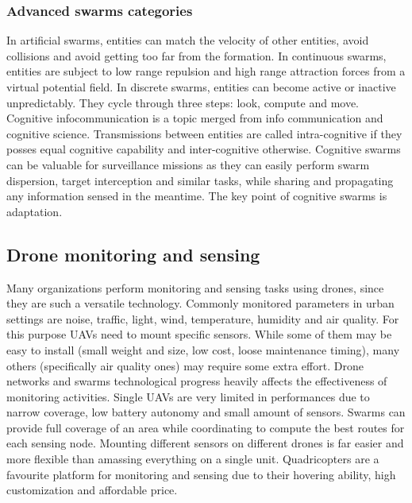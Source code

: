 \documentclass[journal]{IEEEtran}
\begin{document}
\subsubsection{Advanced swarms categories}
In artificial swarms, entities can match the velocity of other entities, avoid collisions and avoid getting too far from the formation. In continuous swarms, entities are subject to low range repulsion and high range attraction forces from a virtual potential field. In discrete swarms, entities can become active or inactive unpredictably. They cycle through three steps: look, compute and move. Cognitive infocommunication is a topic merged from info communication and cognitive science. Transmissions between entities are called intra-cognitive if they posses equal cognitive capability and inter-cognitive otherwise. Cognitive swarms can be valuable for surveillance missions as they can easily perform swarm dispersion, target interception and similar tasks, while sharing and propagating any information sensed in the meantime. The key point of cognitive swarms is adaptation.


\subsection{Drone monitoring and sensing}
Many organizations perform monitoring and sensing tasks using drones, since they are such a versatile technology. Commonly monitored parameters in urban settings are noise, traffic, light, wind, temperature, humidity and air quality. For this purpose UAVs need to mount specific sensors. While some of them may be easy to install (small weight and size, low cost, loose maintenance timing), many others (specifically air quality ones) may require some extra effort. Drone networks and swarms technological progress heavily affects the effectiveness of monitoring activities. Single UAVs are very limited in performances due to narrow coverage, low battery autonomy and small amount of sensors. Swarms can provide full coverage of an area while coordinating to compute the best routes for each sensing node. Mounting different sensors on different drones is far easier and more flexible than amassing everything on a single unit. Quadricopters are a favourite platform \cite{ragno} \cite{leakage} \cite{aqss} for monitoring and sensing due to their hovering ability, high customization and affordable price.
\end{document}
